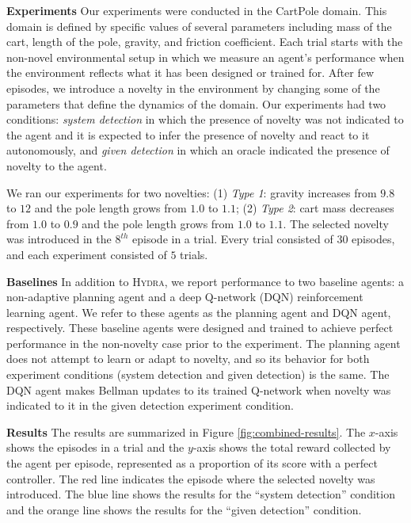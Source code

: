 \documentclass[sigconf]{aamas}
\newcommand{\hydra}{\textsc{Hydra}\xspace} %
\begin{document}

\textbf{Experiments} Our experiments were conducted in the CartPole domain. This domain is defined by specific values of several parameters including mass of the cart, length of the pole, gravity, and friction coefficient. 
Each trial starts with the non-novel environmental setup in which we measure an agent's performance when the environment reflects what it has been designed or trained for. After few episodes, we introduce a novelty in the environment by changing some of the parameters that define the dynamics of the domain. 
Our experiments had two conditions: \emph{system detection} in which the presence of novelty was not indicated to the agent and it is expected to infer the presence of novelty and react to it autonomously, and \emph{given detection} in which an oracle indicated the presence of novelty to the agent.

We ran our experiments for two novelties: 
(1) \emph{Type 1}: gravity increases from $9.8$ to $12$ and the pole length grows from $1.0$ to $1.1$;
(2) \emph{Type 2}: cart mass decreases from $1.0$ to $0.9$ and the pole length grows from $1.0$ to $1.1$. 
The selected novelty was introduced in the $8^{th}$ episode in a trial. 
Every trial consisted of $30$ episodes, and each experiment consisted of $5$ trials.

\textbf{Baselines} In addition to \hydra, we report performance to two baseline agents: 
a non-adaptive planning agent and a deep Q-network (DQN) reinforcement learning agent. 
We refer to these agents as the planning agent and DQN agent, respectively. 
These baseline agents were designed and trained to achieve perfect performance in the non-novelty case prior to the experiment. 
The planning agent does not attempt to learn or adapt to novelty, and so its behavior for both experiment conditions (system detection and given detection) is the same. 
The DQN agent makes Bellman updates to its trained Q-network when novelty was indicated to it in the given detection experiment condition.  

\textbf{Results}
The results are summarized in Figure \ref{fig:combined-results}. The $x$-axis shows the episodes in a trial and the $y$-axis shows the total reward collected by the agent per episode, represented as a proportion of its score with a perfect controller. 
The red line indicates the episode where the selected novelty was introduced. 
The blue line shows the results for the ``system detection'' condition and the orange line shows the results for the ``given detection'' condition. 
\end{document}
